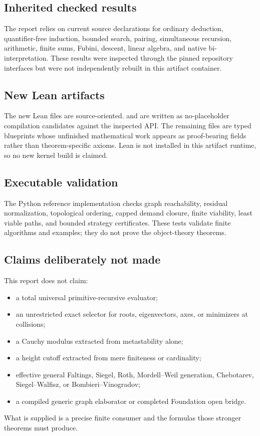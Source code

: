 \subsection{Inherited checked results}

The report relies on current source declarations for ordinary deduction, quantifier-free induction, bounded search, pairing, simultaneous recursion, arithmetic, finite sums, Fubini, descent, linear algebra, and native bi-interpretation.  These results were inspected through the pinned repository interfaces but were not independently rebuilt in this artifact container.

\subsection{New Lean artifacts}

The new Lean files are source-oriented.   and  are written as no-placeholder compilation candidates against the inspected API.  The remaining files are typed blueprints whose unfinished mathematical work appears as proof-bearing fields rather than theorem-specific axioms.  Lean is not installed in this artifact runtime, so no new kernel build is claimed.

\subsection{Executable validation}

The Python reference implementation checks graph reachability, residual normalization, topological ordering, capped demand closure, finite viability, least viable paths, and bounded strategy certificates.  These tests validate finite algorithms and examples; they do not prove the object-theory theorems.

\subsection{Claims deliberately not made}

This report does not claim:
\begin{itemize}
  \item a total universal primitive-recursive evaluator;
  \item an unrestricted exact selector for roots, eigenvectors, axes, or minimizers at collisions;
  \item a Cauchy modulus extracted from metastability alone;
  \item a height cutoff extracted from mere finiteness or cardinality;
  \item effective general Faltings, Siegel, Roth, Mordell--Weil generation, Chebotarev, Siegel--Walfisz, or Bombieri--Vinogradov;
  \item a compiled generic graph elaborator or completed Foundation open bridge.
\end{itemize}
What is supplied is a precise finite consumer and the formulas those stronger theorems must produce.

